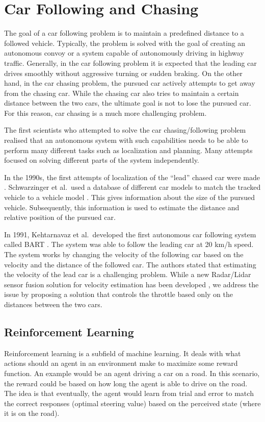\documentclass{ctuthesis/ctuthesis}
\begin{document}
\section{Car Following and Chasing}
The goal of a car following problem is to maintain a predefined distance to a followed vehicle. Typically, the problem is solved with the goal of creating an autonomous convoy or a system capable of autonomously driving in highway traffic. Generally, in the car following problem it is expected that the leading car drives smoothly without aggressive turning or sudden braking. On the other hand, in the car chasing problem, the pursued car actively attempts to get away from the chasing car. While the chasing car also tries to maintain a certain distance between the two cars, the ultimate goal is not to lose the pursued car. For this reason, car chasing is a much more challenging problem. \par



The first scientists who attempted to solve the car chasing/following problem realised that an autonomous system with such capabilities needs to be able to perform many different tasks such as localization and planning. Many attempts focused on solving different parts of the system independently.\par

In the 1990s, the first attempts of localization of the ``lead'' chased car were made \cite{only_detection_and_tracking,also_only_car_tracking,night}. Schwarzinger et al.\ used a database of different car models to match the tracked vehicle to a vehicle model \cite{only_detection_and_tracking}. This gives information about the size of the pursued vehicle. Subsequently, this information is used to estimate the distance and relative position of the pursued car.


In 1991, Kehtarnavaz et al.\ developed the first autonomous car following system called BART \cite{BART_car_following}. The system was able to follow the leading car at 20 km/h speed. The system works by changing the velocity of the following car based on the velocity and the distance of the followed car. The authors stated that estimating the velocity of the lead car is a challenging problem. While a new Radar/Lidar sensor fusion solution for velocity estimation has been developed \cite{lidar_highway}, we address the issue by proposing a solution that controls the throttle based only on the distances between the two cars.


\subsection{Reinforcement Learning}
Reinforcement learning is a subfield of machine learning. It deals with what actions should an agent in an environment make to maximize some reward function. An example would be an agent driving a car on a road. In this scenario, the reward could be based on how long the agent is able to drive on the road. The idea is that eventually, the agent would learn from trial and error to match the correct responses (optimal steering value) based on the perceived state (where it is on the road).\par
\end{document}
